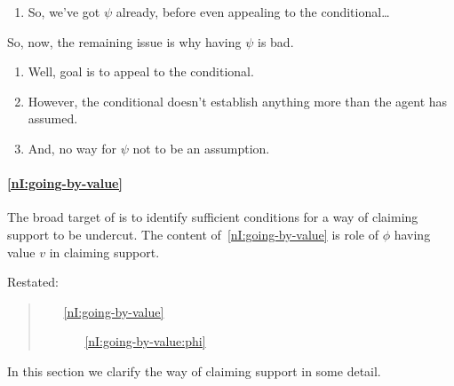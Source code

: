 \begin{note}[Revised]
\begin{enumerate}
  \item So, we've got \(\psi\) already, before even appealing to the conditional\dots
  \end{enumerate}
  So, now, the remaining issue is why having \(\psi\) is bad.
  \begin{enumerate}
  \item Well, goal is to appeal to the conditional.
  \item However, the conditional doesn't establish anything more than the agent has assumed.
  \item And, no way for \(\psi\) not to be an assumption.
  \end{enumerate}
\end{note}




\paragraph{\ref{nI:going-by-value}}


\begin{note}
  The broad target of \nI{} is to identify sufficient conditions for a way of claiming support to be undercut.
  The content of~\ref{nI:going-by-value} is role of \(\phi\) having value \(v\) in claiming support.

  Restated:

  \begin{quote}
    \begin{enumerate}
    \item[\ref{nI:going-by-value}] \nIClauseValue{}
      \begin{enumerate}[label=\alph*.]
      \item[\ref{nI:going-by-value:phi}] \nIClauseValuePhi{}
      \end{enumerate}
    \end{enumerate}
  \end{quote}

  In this section we clarify the way of claiming support in some detail.
\end{note}

